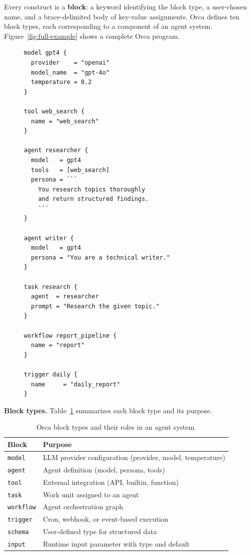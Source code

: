 \documentclass[sigconf,nonacm]{acmart}
\begin{document}
Every construct is a \textbf{block}: a keyword identifying the block type,
a user-chosen name, and a brace-delimited body of key-value assignments.
Orca defines ten block types, each corresponding to a component of an
agent system. Figure~\ref{fig:full-example} shows a complete Orca program.

\begin{figure}[t]
\begin{lstlisting}[caption={A complete Orca program defining a multi-agent
  research-and-writing pipeline.},label={fig:full-example}]
model gpt4 {
  provider    = "openai"
  model_name  = "gpt-4o"
  temperature = 0.2
}

tool web_search {
  name = "web_search"
}

agent researcher {
  model   = gpt4
  tools   = [web_search]
  persona = ```
    You research topics thoroughly
    and return structured findings.
    ```
}

agent writer {
  model   = gpt4
  persona = "You are a technical writer."
}

task research {
  agent  = researcher
  prompt = "Research the given topic."
}

workflow report_pipeline {
  name = "report"
}

trigger daily {
  name     = "daily_report"
}
\end{lstlisting}
\end{figure}

\noindent\textbf{Block types.} Table~\ref{tab:blocks} summarizes each
block type and its purpose.

\begin{table}[t]
\caption{Orca block types and their roles in an agent system.}
\label{tab:blocks}
\centering
\small
\begin{tabular}{@{}ll@{}}
\toprule
\textbf{Block} & \textbf{Purpose} \\
\midrule
\texttt{model}     & LLM provider configuration (provider, model, temperature) \\
\texttt{agent}     & Agent definition (model, persona, tools) \\
\texttt{tool}      & External integration (API, builtin, function) \\
\texttt{task}      & Work unit assigned to an agent \\
\texttt{workflow}  & Agent orchestration graph \\
\texttt{trigger}   & Cron, webhook, or event-based execution \\
\texttt{schema}    & User-defined type for structured data \\
\texttt{input}     & Runtime input parameter with type and default \\
\bottomrule
\end{tabular}
\end{table}
\end{document}
